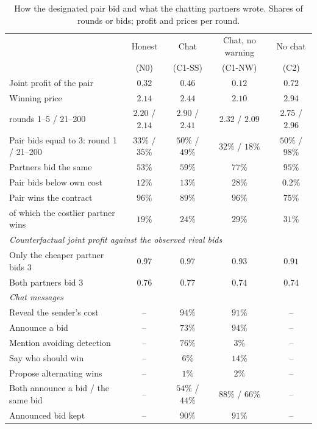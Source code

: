 \begin{table}[htbp]
\centering\small
\caption{How the designated pair bid and what the chatting partners wrote.
Shares of rounds or bids; profit and prices per round.}
\label{tab:mechanics}
\begin{tabular}{lcccc}
\toprule
 & Honest & Chat & Chat, no warning & No chat \\
 & (N0) & (C1-SS) & (C1-NW) & (C2) \\
\midrule
Joint profit of the pair & $0.32$ & $0.46$ & $0.12$ & $0.72$ \\
Winning price & $2.14$ & $2.44$ & $2.10$ & $2.94$ \\
\quad rounds 1--5 / 21--200 & $2.20$ / $2.14$ & $2.90$ / $2.41$ & $2.32$ / $2.09$ & $2.75$ / $2.96$ \\
Pair bids equal to 3: round 1 / 21--200 & $33\%$ / $35\%$ & $50\%$ / $49\%$ & $32\%$ / $18\%$ & $50\%$ / $98\%$ \\
Partners bid the same & $53\%$ & $59\%$ & $77\%$ & $95\%$ \\
Pair bids below own cost & $12\%$ & $13\%$ & $28\%$ & $0.2\%$ \\
Pair wins the contract & $96\%$ & $89\%$ & $96\%$ & $75\%$ \\
\quad of which the costlier partner wins & $19\%$ & $24\%$ & $29\%$ & $31\%$ \\
\midrule
\multicolumn{5}{l}{\emph{Counterfactual joint profit against the observed rival bids}} \\
Only the cheaper partner bids 3 & $0.97$ & $0.97$ & $0.93$ & $0.91$ \\
Both partners bid 3 & $0.76$ & $0.77$ & $0.74$ & $0.74$ \\
\midrule
\multicolumn{5}{l}{\emph{Chat messages}} \\
Reveal the sender's cost & -- & $94\%$ & $91\%$ & -- \\
Announce a bid & -- & $73\%$ & $94\%$ & -- \\
Mention avoiding detection & -- & $76\%$ & $3\%$ & -- \\
Say who should win & -- & $6\%$ & $14\%$ & -- \\
Propose alternating wins & -- & $1\%$ & $2\%$ & -- \\
Both announce a bid / the same bid & -- & $54\%$ / $44\%$ & $88\%$ / $66\%$ & -- \\
Announced bid kept & -- & $90\%$ & $91\%$ & -- \\
\bottomrule
\end{tabular}
\end{table}

